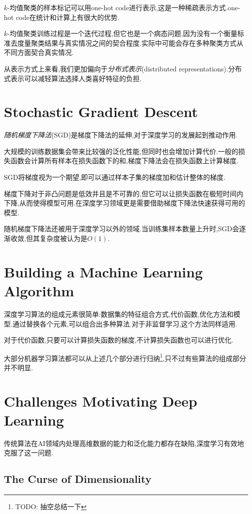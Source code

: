 $k$-均值聚类的样本标记可以用one-hot code进行表示,这是一种稀疏表示方式.one-hot code在统计和计算上有很大的优势.

$k$-均值聚类训练过程是一个迭代过程,但它也是一个病态问题,因为没有一个衡量标准去度量聚类结果与真实情况之间的契合程度.实际中可能会存在多种聚类方式从不同方面契合真实情况.

从表示方式上来看,我们更加偏向于\textit{分布式表示}(distributed representations).分布式表示可以减轻算法选择人类喜好特征的负担.

\section{Stochastic Gradient Descent}

\textit{随机梯度下降法}(SGD)是梯度下降法的延伸,对于深度学习的发展起到推动作用.

大规模的训练数据集会带来比较强的泛化性能,但同时也会增加计算代价.一般的损失函数会计算所有样本在损失函数下的和,梯度下降法会在损失函数上计算梯度.

SGD将梯度视为一个期望,即可以通过样本子集的梯度加和估计整体的梯度.

梯度下降对于非凸问题是低效并且是不可靠的,但它可以让损失函数在极短时间内下降,从而使得模型可用.在深度学习领域更是需要借助梯度下降法快速获得可用的模型.

随机梯度下降法还被用于深度学习以外的领域.当训练集样本数量上升时,SGD会逐渐收敛,但其复杂度被认为是$O(1)$.

\section{Building a Machine Learning Algorithm}

深度学习算法的组成元素很简单:数据集的特征组合方式,代价函数,优化方法和模型.通过替换各个元素,可以组合出多种算法.对于非监督学习,这个方法同样适用.

对于代价函数,只要可以计算损失函数的梯度,不计算损失函数也可以进行优化.

大部分机器学习算法都可以从上述几个部分进行归纳\footnote{TODO: 抽空总结一下},只不过有些算法的组成部分并不明显.

\section{Challenges Motivating Deep Learning}

传统算法在AI领域内处理高维数据的能力和泛化能力都存在缺陷,深度学习有效地克服了这一问题.

\subsection{The Curse of Dimensionality}

